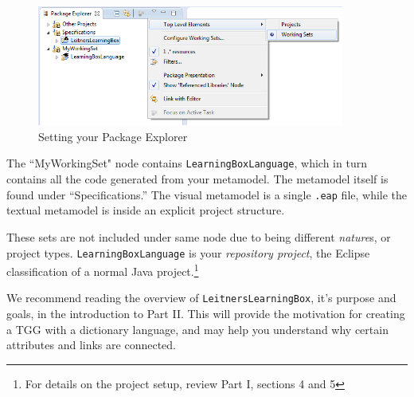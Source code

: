 \begin{itemize}
\vspace{0.5cm}

\begin{figure}[htbp]
	\centering
  \includegraphics[width=0.9\textwidth]{eclipse_workingSets}
	\caption{Setting your Package Explorer}
	\label{fig:workingSets}
\end{figure}

The ``MyWorkingSet" node contains \texttt{Learn\-ing\-Box\-Lang\-uage}, which in turn contains all the code generated from your metamodel. The metamodel itself
is found under ``Specifications.'' The visual metamodel is a single \texttt{.eap} file, while the textual metamodel is inside an explicit project structure.

\vspace{0.5cm}

These sets are not included under same node due to being different \emph{nature}s, or project types. \texttt{Learning\-Box\-Language} is your
\emph{repository project}, the Eclipse classification of a normal Java project.\footnote{For details on the project setup, review Part I, sections 4 and 5} 

\vspace{0.5cm}

We recommend reading the overview of \texttt{LeitnersLearningBox}, it's purpose and goals, in the introduction to Part II. This will provide the
motivation for creating a TGG with a dictionary language, and may help you understand why certain attributes and links are connected.

\end{itemize}




